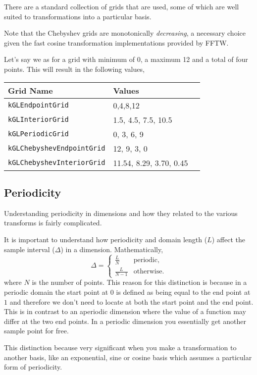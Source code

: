 \documentclass[11pt]{article}
\begin{document}
There are a standard collection of grids that are used, some of which are well suited to transformations into a particular basis.

Note that the Chebyshev grids are monotonically \emph{decreasing}, a necessary choice given the fast cosine transformation implementations provided by FFTW.

Let's say we as for a grid with minimum of 0, a maximum 12 and a total of four points. This will result in the following values,

\begin{tabular}{llL}
      \hline
      Grid Name &Values \tabularnewline \hline \hline
      \verb"kGLEndpointGrid" & 0,4,8,12 \tabularnewline
      \verb"kGLInteriorGrid" & 1.5, 4.5, 7.5, 10.5 \tabularnewline
      \verb"kGLPeriodicGrid" & 0, 3, 6, 9 \tabularnewline
      \verb"kGLChebyshevEndpointGrid" & 12, 9, 3, 0 \tabularnewline
      \verb"kGLChebyshevInteriorGrid" & 11.54, 8.29, 3.70, 0.45 \tabularnewline
      \hline
\end{tabular}

\subsection{Periodicity}

Understanding periodicity in dimensions and how they related to the various transforms is fairly complicated.

It is important to understand how periodicity and domain length ($L$) affect the sample interval ($\Delta$) in a dimension. Mathematically,
\begin{equation}
\Delta =
\begin{cases}
\frac{L}{N}      	& \text{periodic}, \\
\frac{L}{N-1}       & \text{otherwise}.
\end{cases}
\end{equation}
where $N$ is the number of points. This reason for this distinction is because in a periodic domain the start point at $0$ is defined as being equal to the end point at $1$ and therefore we don't need to locate at both the start point and the end point. This is in contrast to an aperiodic dimension where the value of a function may differ at the two end points. In a periodic dimension you essentially get another sample point for free.

This distinction because very significant when you make a transformation to another basis, like an exponential, sine or cosine basis which assumes a particular form of periodicity.
\end{document}
